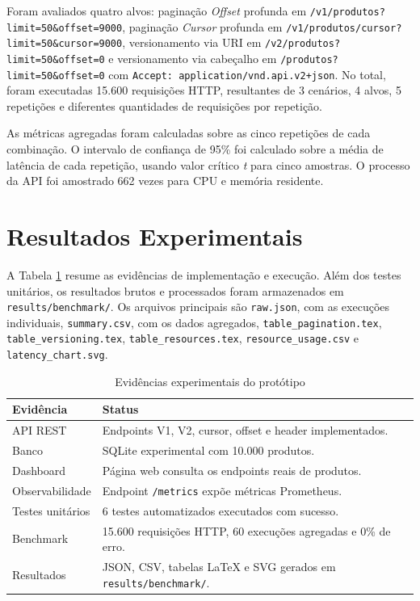 \documentclass[journal]{IEEEtran}
\begin{document}
Foram avaliados quatro alvos: paginação \textit{Offset} profunda em \texttt{/v1/produtos?limit=50\&offset=9000}, paginação \textit{Cursor} profunda em \texttt{/v1/produtos/cursor?limit=50\&cursor=9000}, versionamento via URI em \texttt{/v2/produtos?limit=50\&offset=0} e versionamento via cabeçalho em \texttt{/produtos?limit=50\&offset=0} com \texttt{Accept: application/vnd.api.v2+json}. No total, foram executadas 15.600 requisições HTTP, resultantes de 3 cenários, 4 alvos, 5 repetições e diferentes quantidades de requisições por repetição.

As métricas agregadas foram calculadas sobre as cinco repetições de cada combinação. O intervalo de confiança de 95\% foi calculado sobre a média de latência de cada repetição, usando valor crítico \textit{t} para cinco amostras. O processo da API foi amostrado 662 vezes para CPU e memória residente.


\section{Resultados Experimentais}

A Tabela \ref{tab:evidencias} resume as evidências de implementação e execução. Além dos testes unitários, os resultados brutos e processados foram armazenados em \texttt{results/benchmark/}. Os arquivos principais são \texttt{raw.json}, com as execuções individuais, \texttt{summary.csv}, com os dados agregados, \texttt{table\_pagination.tex}, \texttt{table\_versioning.tex}, \texttt{table\_resources.tex}, \texttt{resource\_usage.csv} e \texttt{latency\_chart.svg}.

\begin{table}[htbp]
\caption{Evidências experimentais do protótipo}
\label{tab:evidencias}
\centering
\renewcommand{\arraystretch}{1.2}
\begin{tabularx}{\columnwidth}{lX}
\toprule
\textbf{Evidência} & \textbf{Status} \\
\midrule
API REST & Endpoints V1, V2, cursor, offset e header implementados. \\
Banco & SQLite experimental com 10.000 produtos. \\
Dashboard & Página web consulta os endpoints reais de produtos. \\
Observabilidade & Endpoint \texttt{/metrics} expõe métricas Prometheus. \\
Testes unitários & 6 testes automatizados executados com sucesso. \\
Benchmark & 15.600 requisições HTTP, 60 execuções agregadas e 0\% de erro. \\
Resultados & JSON, CSV, tabelas LaTeX e SVG gerados em \texttt{results/benchmark/}. \\
\bottomrule
\end{tabularx}
\end{table}
\end{document}
